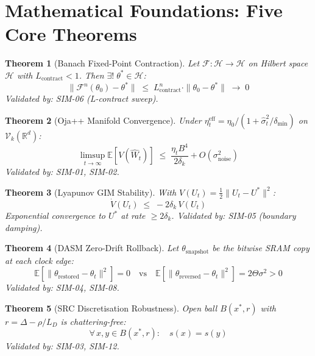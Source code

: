 \documentclass[12pt, a4paper]{article}
\newtheorem{theorem}{Theorem}[section]
\begin{document}
\section{Mathematical Foundations: Five Core Theorems}
\label{sec:theorems}

\begin{theorem}[Banach Fixed-Point Contraction]
  Let $\mathcal{F}: \mathcal{H} \to \mathcal{H}$ on Hilbert space $\mathcal{H}$
  with $L_{\text{contract}} < 1$. Then $\exists!\; \theta^* \in \mathcal{H}$:
  $$
  \|\mathcal{F}^n(\theta_0) - \theta^*\| \;\leq\; L_{\text{contract}}^n \cdot \|\theta_0 - \theta^*\| \;\to\; 0
  $$
  \textit{Validated by: SIM-06 (L-contract sweep)}.
\end{theorem}

\begin{theorem}[Oja++ Manifold Convergence]
  Under $\eta_t^{\text{eff}} = \eta_0 / (1 + \hat{\sigma}^2_t / \delta_{\min})$
  on $\mathcal{V}_k(\mathbb{R}^d)$:
  $$
  \limsup_{t \to \infty} \mathbb{E}[V(\hat{W}_t)] \;\leq\; \frac{\eta_t B^4}{2\delta_k} + O(\sigma^2_{\text{noise}})
  $$
  \textit{Validated by: SIM-01, SIM-02}.
\end{theorem}

\begin{theorem}[Lyapunov GIM Stability]
  With $V(U_t) = \frac{1}{2}\|U_t - U^*\|^2$:
  $$
  \dot{V}(U_t) \;\leq\; -2\delta_k\,V(U_t)
  $$
  Exponential convergence to $U^*$ at rate $\geq 2\delta_k$.
  \textit{Validated by: SIM-05 (boundary damping)}.
\end{theorem}

\begin{theorem}[DASM Zero-Drift Rollback]
  Let $\theta_{\text{snapshot}}$ be the bitwise SRAM copy at each clock edge:
  $$
  \mathbb{E}\!\left[\|\theta_{\text{restored}} - \theta_t\|^2\right] = 0 \quad \text{vs} \quad
  \mathbb{E}[\|\theta_{\text{reversed}} - \theta_t\|^2] = 2\Theta\sigma^2 > 0
  $$
  \textit{Validated by: SIM-04, SIM-08}.
\end{theorem}

\begin{theorem}[SRC Discretisation Robustness]
  Open ball $B(x^*, r)$ with $r = \Delta - \rho/L_D$ is chattering-free:
  $$
  \forall\, x, y \in B(x^*, r): \quad s(x) = s(y)
  $$
  \textit{Validated by: SIM-03, SIM-12}.
\end{theorem}
\end{document}
